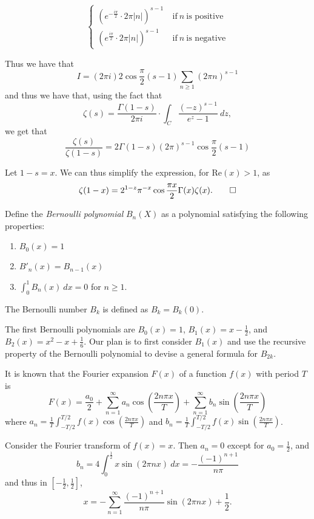 \documentclass[a4paper, 12pt,oneside,openany]{book}
\begin{document}
$$\begin{cases}
	(e^{-\frac{i \pi}{2}}\cdot 2\pi|n|)^{s-1} & \ \text{if}\ n\ \text{is positive} \\
	(e^{\frac{i \pi}{2}}\cdot 2\pi|n|)^{s-1} & \ \text{if}\ n\ \text{is negative}	 
\end{cases}$$

Thus we have that $$I=(2\pi i) 2\cos\frac{\pi}{2}(s-1) \sum\limits_{n\geq 1} (2\pi n)^{s-1}$$ and thus we have that, using the fact that $$\zeta(s)=\frac{\Gamma(1-s)}{2\pi i} \cdot \int_C \frac{(-z)^{s-1}}{e^z-1}\ dz,$$ we get that $$\frac{\zeta(s)}{\zeta(1-s)}=2\Gamma(1-s)(2\pi)^{s-1}\cos{\frac{\pi}{2}}(s-1)$$

Let $1-s=x$. We can thus simplify the expression, for $\text{Re}(x)>1$, as $$\zeta(1-x)=2^{1-z}\pi^{-x} \cos{\frac{\pi x}{2}}\Gamma(x)\zeta(x). \qed$$

 Define the \emph{Bernoulli polynomial} $B_n(X)$ as a polynomial satisfying the following properties:

\begin{enumerate}
	\item $B_0(x)=1$
	\item $B'_n(x) = B_{n-1}(x)$
	\item $\int_0^1 B_n(x)\ dx = 0$ for $n\geq 1$.
\end{enumerate}

The Bernoulli number $B_k$ is defined as $B_k=B_k(0)$.

The first Bernoulli polynomials are $B_0(x)=1$, $B_1(x)=x-\frac{1}{2}$, and $B_2(x)=x^2-x+\frac{1}{6}$. Our plan is to first consider $B_1(x)$ and use the recursive property of the Bernoulli polynomial to devise a general formula for $B_{2k}$.

It is known that the Fourier expansion $F(x)$ of a function $f(x)$ with period $T$ is $$F(x)=\frac{a_0}{2}+\sum\limits_{n=1}^\infty a_n \cos\left(\frac{2n\pi x}{T} \right)+\sum\limits_{n=1}^\infty b_n \sin\left(\frac{2n\pi x}{T} \right)$$ where $a_n=\frac{1}{T}\int_{-T/2}^{T/2} f(x) \cos\left(\frac{2n\pi x}{T} \right)$ and $b_n=\frac{1}{T}\int_{-T/2}^{T/2} f(x) \sin\left(\frac{2n\pi x}{T} \right)$.

Consider the Fourier transform of $f(x)=x$. Then $a_n=0$ except for $a_0=\frac{1}{2}$, and $$b_n=4\int_0^{\frac{1}{2}} x\sin(2\pi n x)\ dx = -\frac{(-1)^{n+1}}{n\pi}$$ and thus in $[-\frac{1}{2}, \frac{1}{2}]$, $$x=-\sum\limits_{n=1}^{\infty} \frac{(-1)^{n+1}}{n\pi} \sin(2\pi n x)+\frac{1}{2}.$$
\end{document}
